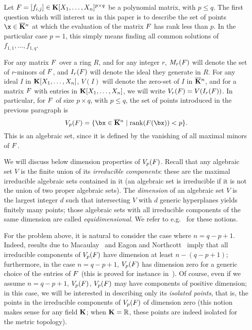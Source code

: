 \documentclass[12pt]{article}
\begin{document}
Let ${F}=[f_{i,j}] \in
\mathbf{K}[X_1,\dots,X_n]^{p \times q}$ be a polynomial matrix, with $p \leq
q$. The first question which will interest us in this paper is to
describe the set of points $\x \in \KKbar{}^n$ at which the evaluation
of the matrix ${F}$ has rank less than $p$.  In the particular case
$p=1$, this simply means finding all common solutions of
$f_{1,1},\dots,f_{1,q}$.

For any matrix ${F}$ over a ring $R$, and for any integer $r$,
$M_r({F})$ will denote the set of $r$-minors of ${F}$, and $I_r({F})$
will denote the ideal they generate in $R$. For any ideal $I$ in $\mathbf{K}[X_1,\dots,X_n]$, $V(I)$ will denote the
zero-set of $I$ in $\overline{\mathbf{K}}{}^n$, and for a matrix ${F}$ with entries in 
$\mathbf{K}[X_1,\dots,X_n]$, we will write $V_r({F})=V(I_r({F}))$. In particular,
for ${F}$ of size $p \times q$, with $p \le q$, the set of points
introduced in the previous paragraph is
$$\VpF{p}{\mF}=\{\bx \in \KKbar{}^n \mid \mathrm{rank}(\mF({\bx})) < p\}.$$
This is an algebraic set, since it is defined by the vanishing of
all maximal minors of ${F}$. 

We will discuss below dimension properties of $V_{p}({F})$.  Recall
that any algebraic set $V$ is the finite union of its
\emph{irreducible components}: these are the maximal irreducible
algebraic sets contained in it (an algebraic set is irreducible if it
is not the union of two proper algebraic sets). The {\em dimension} of
an algebraic set $V$ is the largest integer $d$ such that intersecting
$V$ with $d$ generic hyperplanes yields finitely many points; those
algebraic sets with all irreducible components of the same dimension
are called {\em equidimensional}. We refer to
e.g.~\cite{Shafarevich77} for these notions.

For the problem above, it is natural to consider the case where $n =
q-p+1$.  Indeed, results due to Macaulay~\cite{Macaulay16} and Eagon
and Northcott~\cite{EN62} imply that all irreducible components of
$V_{p}({F})$ have dimension at least $n-(q-p+1)$; furthermore, in
the case $n = q-p+1$, $V_{p}({F})$ has dimension zero for a generic
choice of the entries of ${F}$ (this is proved for instance
in~\cite{Spa14}). Of course, even if we assume $n = q-p+1$,
$V_{p}({F})$, $V_{p}({F})$ may have components of positive
dimension; in this case, we will be interested in describing only its
{\em isolated points}, that is, the points in the irreducible
components of $V_{p}({F})$ of dimension zero (this notion makes
sense for any field $\mathbf{K}$; when $\mathbf{K}=\mathbb{R}$, these points are
indeed isolated for the metric topology).
\end{document}

